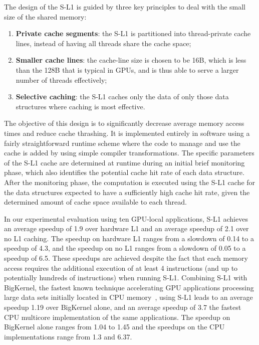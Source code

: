 The design of the S-L1 is guided by three key principles to deal with the small size of
the shared memory:
\begin{enumerate}
\item {\bf Private cache segments}: the S-L1 is partitioned into thread-private cache lines,
instead of having all threads share the cache space; 
\item {\bf Smaller cache lines}: the cache-line size is chosen to be 16B, which is less than the 128B that is typical in GPUs, and is thus able to serve a larger number of threads effectively;
\item {\bf Selective caching}: the S-L1 caches only the data of only those data structures where caching is most effective.
\end{enumerate}
The objective of this design is to significantly decrease average memory access times and reduce 
cache thrashing. 
It is implemented entirely in software using a fairly straightforward runtime scheme where the code
to manage and use the cache is added by using simple compiler transformations.
The specific parameters of the S-L1 cache are determined at runtime during an initial brief
monitoring phase, which also identifies the potential cache hit rate of each data structure.
After the monitoring phase, the computation is executed using the S-L1 cache for the data structures expected to have a sufficiently
high cache hit rate, given the determined amount of cache space available to each thread.

In our experimental evaluation using ten GPU-local applications, S-L1 achieves an average speedup of 1.9 over hardware L1 and an average speedup of 2.1
over no L1 caching. The speedup on hardware L1 ranges from a slowdown of 0.14 to a speedup of 4.3, and the speedup on no L1
ranges from a slowdown of 0.05 to a speedup of 6.5. These speedups are achieved despite the fact that each memory access requires the additional
execution of at least 4 instructions (and up to potentially hundreds of instructions) when running S-L1.
Combining S-L1 with BigKernel, the fastest known technique accelerating GPU applications processing
large data sets initially located in CPU memory~\cite{mokhtari2014bigkernel}, using S-L1 leads to an average speedup 1.19 over BigKernel alone,
and an average speedup of 3.7 the fastest CPU multicore implementation
of the same applications. The speedup on BigKernel alone ranges from 1.04 to 1.45 and the speedups on the CPU implementations range from
1.3 and 6.37.

\vspace{0.2cm}

